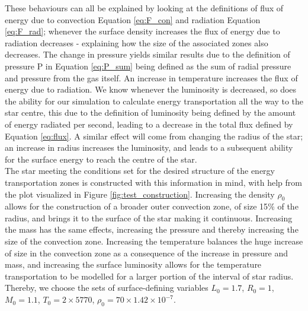 \documentclass[10pt, nofootinbib, twocolumn]{revtex4-1}
\begin{document}
These behaviours can all be explained by looking at the definitions of flux of energy due to convection Equation \eqref{eq:F_con} and radiation Equation \eqref{eq:F_rad}; whenever the surface density increases the flux of energy due to radiation decreases - explaining how the size of the associated zones also decreases. The change in pressure yields similar results due to the definition of pressure P in Equation \eqref{eq:P_sum} being defined as the sum of radial pressure and pressure from the gas itself. An increase in temperature increases the flux of energy due to radiation. We know whenever the luminosity is decreased, so does the ability for our simulation to calculate energy transportation all the way to the star centre, this due to the definition of luminosity being defined by the amount of energy radiated per second, leading to a decrease in the total flux defined by Equation \eqref{eq:flux}. A similar effect will come from changing the radius of the star; an increase in radius increases the luminosity, and leads to a subsequent ability for the surface energy to reach the centre of the star. \\

The star meeting the conditions set for the desired structure of the energy transportation zones is constructed with this information in mind, with help from the plot visualized in Figure \ref{fig:test_construction}. Increasing the density $\rho_0$ allows for the construction of a broader outer convection zone, of size 15$\%$ of the radius, and brings it to the surface of the star making it continuous. Increasing the mass has the same effects, increasing the pressure and thereby increasing the size of the convection zone. Increasing the temperature balances the huge increase of size in the convection zone as a consequence of the increase in pressure and mass, and increasing the surface luminosity allows for the temperature transportation to be modelled for a larger portion of the interval of star radius. Thereby, we choose the sets of surface-defining variables $L_0=1.7$, $R_0=1$, $M_0=1.1$, $T_0=2\times5770$, $\rho_0=70\times1.42\times 10^{-7}$.\\

\end{document}

